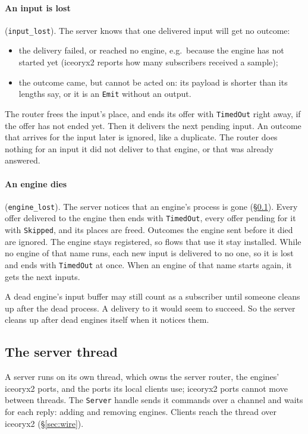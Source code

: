 \documentclass[11pt]{article}
\newcommand{\code}[1]{\texttt{#1}}
\begin{document}
\paragraph{An input is lost} (\code{input\_lost}). The server knows that one
delivered input will get no outcome:
\begin{itemize}[nosep]
  \item the delivery failed, or reached no engine, e.g.\ because the engine
        has not started yet (iceoryx2 reports how many subscribers received a
        sample);
  \item the outcome came, but cannot be acted on: its payload is shorter
        than its lengths say, or it is an \code{Emit} without an output.
\end{itemize}
The router frees the input's place, and ends its offer with \code{TimedOut}
right away, if the offer has not ended yet. Then it delivers the next pending
input. An outcome that arrives for the input later is ignored, like a
duplicate. The router does nothing for an input it did not deliver to that
engine, or that was already answered.

\paragraph{An engine dies} (\code{engine\_lost}). The server notices that an
engine's process is gone (\S\ref{sec:server-thread}). Every offer
delivered to the engine then ends with \code{TimedOut}, every offer pending for
it with \code{Skipped}, and its places are freed. Outcomes the engine sent
before it died are ignored. The engine stays registered, so flows that use it
stay installed. While no engine of that name runs, each new input is
delivered to no one, so it is lost and ends with \code{TimedOut} at once. When
an engine of that name starts again, it gets the next inputs.

A dead engine's input buffer may still count as a subscriber until someone
cleans up after the dead process. A delivery to it would seem to succeed. So
the server cleans up after dead engines itself when it notices them.

\subsection{The server thread}
\label{sec:server-thread}

A server runs on its own thread, which owns the server router, the
engines' iceoryx2 ports, and the ports its local clients use; iceoryx2 ports
cannot move between threads. The \code{Server} handle sends it commands over a
channel and waits for each reply: adding and removing engines. Clients reach
the thread over iceoryx2 (\S\ref{sec:wire}).
\end{document}

